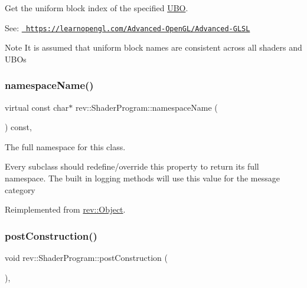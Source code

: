 Get the uniform block index of the specified \mbox{\hyperlink{classrev_1_1_u_b_o}{U\+BO}}. 

See\+: \href{https://learnopengl.com/Advanced-OpenGL/Advanced-GLSL}{\texttt{ https\+://learnopengl.\+com/\+Advanced-\/\+Open\+G\+L/\+Advanced-\/\+G\+L\+SL}} \begin{DoxyNote}{Note}
It is assumed that uniform block names are consistent across all shaders and U\+B\+Os 
\end{DoxyNote}
\mbox{\label{classrev_1_1_shader_program_a7e4e75492bd44ea8e9350cd720698e3e}} 
\subsubsection{\texorpdfstring{namespaceName()}{namespaceName()}}
{\footnotesize\ttfamily virtual const char$\ast$ rev\+::\+Shader\+Program\+::namespace\+Name (\begin{DoxyParamCaption}{ }\end{DoxyParamCaption}) const\hspace{0.3cm}{\ttfamily [inline]}, {\ttfamily [virtual]}}



The full namespace for this class. 

Every subclass should redefine/override this property to return its full namespace. The built in logging methods will use this value for the message category 

Reimplemented from \mbox{\hyperlink{classrev_1_1_object_aaeb638d3e10f361c56c211a318a27f3d}{rev\+::\+Object}}.

\mbox{\label{classrev_1_1_shader_program_a1b08ee659241ede0227457821a4971a2}} 
\subsubsection{\texorpdfstring{postConstruction()}{postConstruction()}}
{\footnotesize\ttfamily void rev\+::\+Shader\+Program\+::post\+Construction (\begin{DoxyParamCaption}{ }\end{DoxyParamCaption})\hspace{0.3cm}{\ttfamily [override]}, {\ttfamily [virtual]}}




